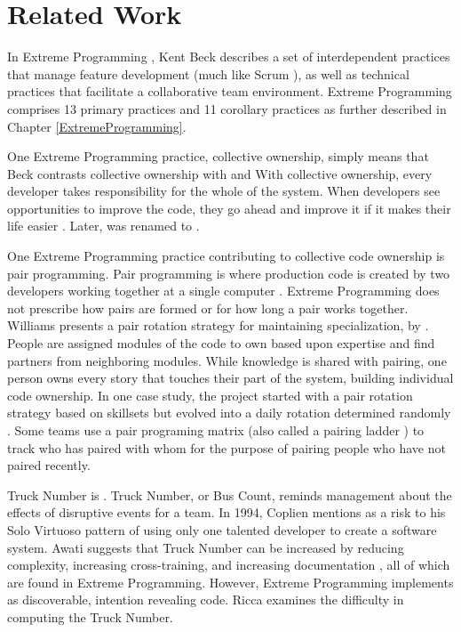 \section{Related Work}
\label{SustainableSoftwareDevelopmentRelatedWork}
In Extreme Programming \cite{BeckExtremeProgramming2004}, Kent Beck describes a set of interdependent practices that manage feature development (much like Scrum \cite{SchwaberScrum}), as well as technical practices that facilitate a collaborative team environment. Extreme Programming comprises 13 primary practices and 11 corollary practices as further described in Chapter \ref{ExtremeProgramming}. 

One Extreme Programming practice, collective ownership, simply means that  Beck contrasts collective ownership with  and  With collective ownership, every developer takes responsibility for the whole of the system. When developers see opportunities to improve the code, they go ahead and improve it if it makes their life easier \cite{BeckExtremeProgramming1999}. Later,  was renamed to  \cite{BeckExtremeProgramming2004}. 

One Extreme Programming practice contributing to collective code ownership is pair programming. Pair programming is where production code is created by two developers working together at a single computer \cite{BeckExtremeProgramming2004}. Extreme Programming does not prescribe how pairs are formed or for how long a pair works together. Williams presents a pair rotation strategy for maintaining specialization, by   \cite{Williams2002}. People are assigned modules of the code to own based upon expertise and find partners from neighboring modules. While knowledge is shared with pairing, one person owns every story that touches their part of the system, building individual code ownership. In one case study, the project started with a pair rotation strategy based on skillsets but evolved into a daily rotation determined randomly \cite{Vanhanen2007}. Some teams use a pair programing matrix \cite{AlaverdyanPairProgrammingMatrix} (also called a pairing ladder \cite{Davies2009AgileCoaching}) to track who has paired with whom for the purpose of pairing people who have not paired recently.

Truck Number is  \cite{WikiTruckNumber}. Truck Number, or Bus Count, reminds management about the effects of disruptive events for a team. In 1994, Coplien \cite{Coplien1994} mentions  as a risk to his Solo Virtuoso pattern of using only one talented developer to create a software system. Awati suggests that Truck Number can be increased by reducing complexity, increasing cross-training, and increasing documentation \cite{AwatiBusFactor}, all of which are found in Extreme Programming. However, Extreme Programming implements  as discoverable, intention revealing code. Ricca \cite{Ricca2011TruckFactor} examines the difficulty in computing the Truck Number. 

